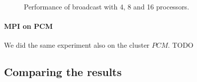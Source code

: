 \begin{figure}[h]
	\caption{Performance of broadcast with 4, 8 and 16 processors.}
	\label{pianosa-mpi-3}
\end{figure}

\clearpage

\paragraph{MPI on PCM}
We did the same experiment also on the cluster $PCM$. TODO





\subsection{Comparing the results}